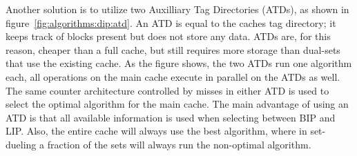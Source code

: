 Another solution is to utilize two Auxilliary Tag Directories (ATDs), as shown in figure~\ref{fig:algorithms:dip:atd}.
An ATD is equal to the caches tag directory; it keeps track of blocks present but does not store any data.
ATDs are, for this reason, cheaper than a full cache, but still requires more storage than dual-sets that use the existing cache.
As the figure shows, the two ATDs run one algorithm each, all operations on the main cache execute in parallel on the ATDs as well.
The same counter architecture controlled by misses in either ATD is used to select the optimal algorithm for the main cache.
The main advantage of using an ATD is that all available information is used when selecting between BIP and LIP.
Also, the entire cache will always use the best algorithm, where in set-dueling a fraction of the sets will always run the non-optimal algorithm.
